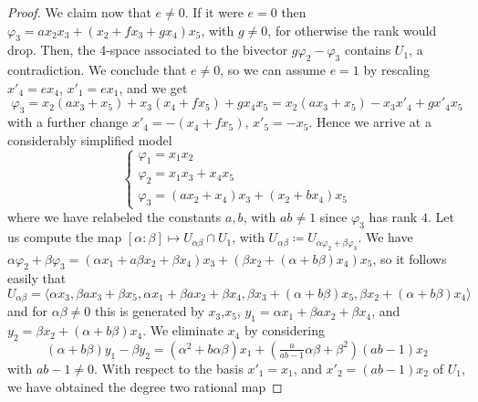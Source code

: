 \documentclass[10pt,a4paper]{amsart}
\newcommand{\f}{\varphi}
\newcommand{\la}{\langle}
\newcommand{\ra}{\rangle}
\renewcommand{\a}{\alpha}
\renewcommand{\b}{\beta}
\begin{document}
\begin{proof}
\item We claim now that $e\ne 0$. If it were $e=0$ then $\f_3=ax_2x_3+(x_2+fx_3+gx_4)x_5$, with $g \ne 0$, for otherwise the rank would drop. Then, the 4-space associated to the bivector $g\f_2-\f_3$ contains $U_1$, a contradiction.
We conclude that $e \ne 0$, so we can assume $e=1$ by rescaling $x'_4=ex_4$, $x'_1=ex_1$, and we get 
\[
\f_3=x_2(ax_3+x_5)+x_3(x_4+fx_5)+gx_4x_5=x_2(ax_3+x_5)-x_3x'_4+gx'_4x_5
\]
with a further change $x'_4=-(x_4+fx_5)$, $x'_5=-x_5$. Hence we arrive at a considerably simplified model
\begin{equation} \label{eq:model16-preliminary}
 \begin{cases}
    \f_1=x_1x_2 \\
    \f_2=x_1x_3+x_4x_5 \\
    \f_3=(ax_2+x_4)x_3+(x_2+bx_4)x_5
\end{cases}   
\end{equation}
where we have relabeled the constants $a,b$, with $ab \ne 1$ since $\f_3$ has rank $4$. Let us compute the map $[\a:\b] \mapsto U_{\a \b } \cap U_1$, with $U_{\a \b}\coloneqq U_{\a \f_2+ \b \f_3}$. We have $\a \f_2+\b \f_3=(\a x_1+a\b x_2+\b x_4)x_3+(\b x_2+(\a+b\b)x_4)x_5$, so it follows easily that
\[
U_{\a \b}=\la\a x_3,\b ax_3+\b x_5,\a x_1+\b a x_2+\b x_4,\b x_3 + (\a + b \b) x_5,\b x_2+(\a+b \b) x_4\ra
\]
and for $\a\b\ne 0$ this is generated by $x_3$,$x_5$, $y_1=\a x_1+\b ax_2+\b x_4$, and $y_2=\b x_2+(\a+b \b)x_4$. We eliminate $x_4$ by considering 
\[
(\a +b \b)y_1-\b y_2=(\a^2+b \a \b)x_1+(\tfrac{a}{ab-1} \a \b +\b^2) (ab-1)x_2
\]
with $ab-1 \ne 0$. With respect to the basis $x'_1=x_1$, and $x'_2=(ab-1)x_2$ of $U_1$, we have obtained the degree two rational map 

\end{proof}
\end{document}
